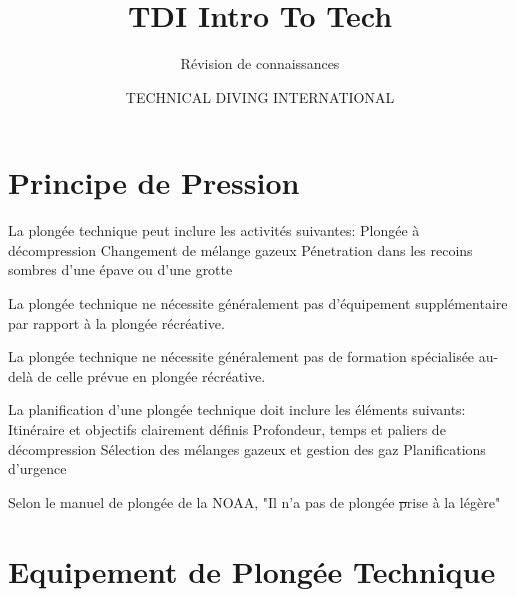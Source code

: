 \documentclass[english,10pt,a4paper]{article}
\title{TDI Intro To Tech}
\subtitle{Révision de connaissances}
\author{TECHNICAL DIVING INTERNATIONAL}
\begin{document}


	\section{Principe de Pression}

	\begin{outline}
		\1 La plongée technique peut inclure les activités suivantes:
			\2 Plongée à décompression
			\2 Changement de mélange gazeux
			\2 Pénetration dans les recoins sombres d'une épave ou d'une grotte
	
		\1 La plongée technique ne nécessite généralement pas d'équipement supplémentaire par rapport à la plongée récréative. \vf

		\1 La plongée technique ne nécessite généralement pas de formation spécialisée au-delà de celle prévue en plongée récréative. \vf

		\1 La planification d'une plongée technique doit inclure les éléments suivants:
			\2 Itinéraire et objectifs clairement définis
			\2 Profondeur, temps et paliers de décompression
			\2 Sélection des mélanges gazeux et gestion des gaz
			\2 Planifications d'urgence

		\1 Selon le manuel de plongée de la NOAA, "Il n'a pas de plongée \st prise à la légère"
	\end{outline}
	\pagebreak

	\section{Equipement de Plongée Technique}
\end{document}
